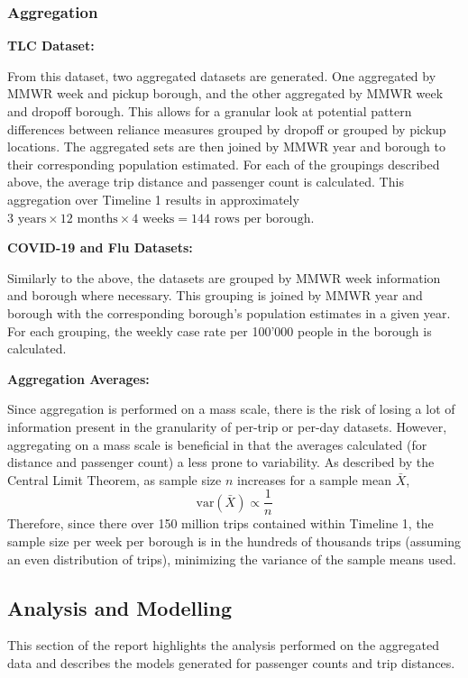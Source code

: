 \documentclass[11pt]{article}
\begin{document}
\subsubsection{Aggregation}

\textbf{TLC Dataset:}

From this dataset, two aggregated datasets are generated.
One aggregated by MMWR week and pickup borough, and the other aggregated by MMWR week and dropoff borough.
This allows for a granular look at potential pattern differences between reliance measures grouped by dropoff or grouped by pickup locations.
The aggregated sets are then joined by MMWR year and borough to their corresponding population estimated.
For each of the groupings described above, 
the average trip distance and passenger count is calculated.
This aggregation over Timeline 1 results in approximately $3 \text{ years} \times 12 \text{ months} \times 4 \text{ weeks} = 144 \text{ rows per borough}$.

\textbf{COVID-19 and Flu Datasets:}

Similarly to the above, the datasets are grouped by MMWR week information and borough where necessary.
This grouping is joined by MMWR year and borough with the corresponding borough's population estimates in a given year.
For each grouping, the weekly case rate per 100'000 people in the borough is calculated.

\textbf{Aggregation Averages:}

Since aggregation is performed on a mass scale, there is the risk of losing a lot of information present in the granularity of per-trip or per-day datasets.
However, aggregating on a mass scale is beneficial in that the averages calculated (for distance and passenger count)
a less prone to variability. As described by the Central Limit Theorem, as sample size $n$ increases for a sample mean $\bar{X}$,
\begin{equation*}
    \text{var}(\bar{X}) \propto \frac{1}{n}
\end{equation*}
Therefore, since there over 150 million trips contained within Timeline 1, the sample size per week per borough is in the hundreds of thousands trips (assuming an even distribution of trips),
minimizing the variance of the sample means used.

\subsection{Analysis and Modelling}

This section of the report highlights the analysis performed on the aggregated data
and describes the models generated for passenger counts and trip distances.
\end{document}
